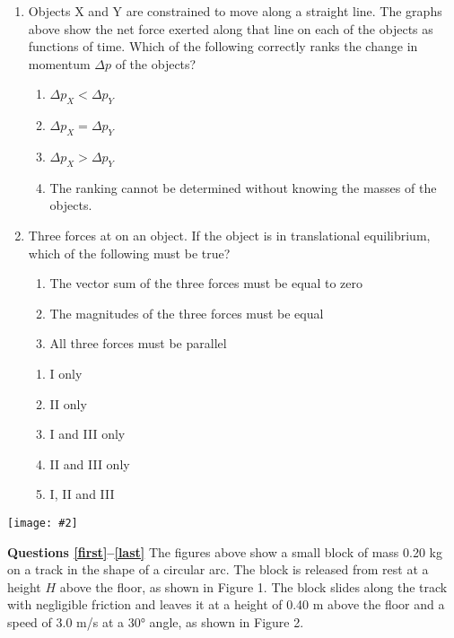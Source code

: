 \documentclass[11pt]{article}
\newcommand{\pic}[2]{\texttt{[image: \#2]}}
\begin{document}
\begin{multicols}{2}
\begin{enumerate}[leftmargin=18pt]
    \begin{center}
      \pic{.38}{impulses}
    \end{center}
  \item Objects X and Y are constrained to move along a straight line. The
    graphs above show the net force exerted along that line on each of the
    objects as functions of time. Which of the following correctly ranks the
    change in momentum $\Delta p$ of the objects?
    \begin{enumerate}[nosep,leftmargin=18pt,label=(\Alph*)]
    \item $\Delta p_X < \Delta p_Y$
    \item $\Delta p_X = \Delta p_Y$ 
    \item $\Delta p_X > \Delta p_Y$
    \item The ranking cannot be determined without knowing the masses of the
      objects.
    \end{enumerate}
    \vspace{.7in}
    \columnbreak
    
  \item Three forces at on an object. If the object is in translational
    equilibrium, which of the following must be true?
    \begin{enumerate}[nosep,leftmargin=18pt,label={\Roman*.}]
    \item The vector sum of the three forces must be equal to zero
    \item The magnitudes of the three forces must be equal
    \item All three forces must be parallel
    \end{enumerate}
    \begin{enumerate}[nosep,leftmargin=18pt,label=(\Alph*)]
    \item I only
    \item II only
    \item I and III only
    \item II and III only
    \item I, II and III
    \end{enumerate}
    \vspace{.7in}    
  \end{enumerate}
  
  \begin{center}
    \pic{.5}{circular-arc}
  \end{center}
  \textbf{Questions \ref{first}--\ref{last}} The figures above show a small
  block of mass 0.20 kg on a track in the shape of a circular arc. The block is
  released from rest at a height $H$ above the floor, as shown in Figure 1. The
  block slides along the track with negligible friction and leaves it at a
  height of 0.40 m above the floor and a speed of 3.0 m/s at a \ang{30} angle,
  as shown in Figure 2.


\end{multicols}
\end{document}
